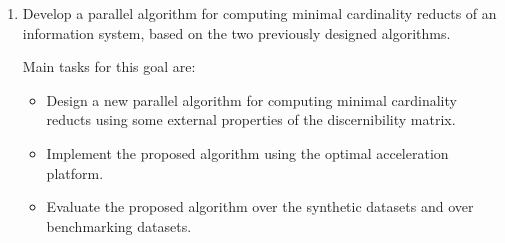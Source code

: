 \documentclass[11pt,authoryear]{elsarticle}
\begin{document}
\begin{enumerate}
  \item Develop a parallel algorithm for computing minimal cardinality reducts of an information system, based 
  		on the two previously designed algorithms.
  		
  		Main tasks for this goal are:
  		\begin{itemize}
  		\item Design a new parallel algorithm for computing minimal cardinality reducts using some external
  		      properties of the discernibility matrix.
  		\item Implement the proposed algorithm using the optimal acceleration platform.
  		\item Evaluate the proposed algorithm over the synthetic datasets and over benchmarking datasets.
  		\end{itemize}
  \end{enumerate}
%
%  
\end{document}
